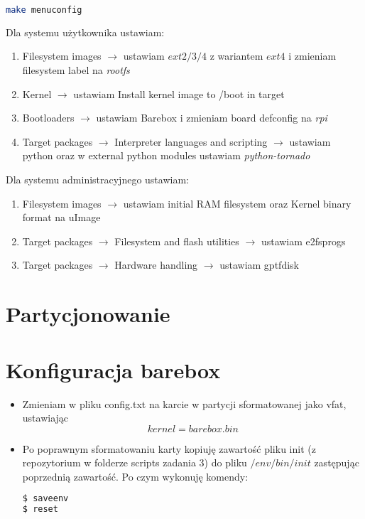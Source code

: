 \begin{lstlisting}[language=bash]
make menuconfig
\end{lstlisting}	

Dla systemu użytkownika ustawiam:
\begin{enumerate}
\item Filesystem images $\rightarrow$ ustawiam $ext2/3/4$ z wariantem $ext4$ i zmieniam filesystem label na \emph{rootfs}
\item Kernel $\rightarrow$ ustawiam Install kernel image to /boot in target
\item Bootloaders $\rightarrow$ ustawiam Barebox i zmieniam board defconfig na \emph{rpi}
\item Target packages $\rightarrow$ Interpreter languages and scripting $\rightarrow$ ustawiam python oraz w external python modules ustawiam \emph{python-tornado}
\end{enumerate}

Dla systemu administracyjnego ustawiam:
\begin{enumerate}
\item Filesystem images $\rightarrow$ ustawiam initial RAM filesystem oraz Kernel binary format na uImage
\item Target packages $\rightarrow$ Filesystem and flash utilities $\rightarrow$ ustawiam e2fsprogs
\item Target packages $\rightarrow$ Hardware handling $\rightarrow$ ustawiam gptfdisk 
\end{enumerate}

\section{Partycjonowanie}


\section{Konfiguracja barebox}
\begin{itemize}
\item Zmieniam w pliku config.txt na karcie w partycji sformatowanej jako vfat, ustawiając
$$kernel=barebox.bin$$
\item Po poprawnym sformatowaniu karty kopiuję zawartość pliku init (z repozytorium w folderze scripts zadania 3) do pliku $ /env/bin/init $ zastępując poprzednią zawartość. Po czym wykonuję komendy:
\begin{lstlisting}[language=bash]
$ saveenv
$ reset
\end{lstlisting}	
\end{itemize}

